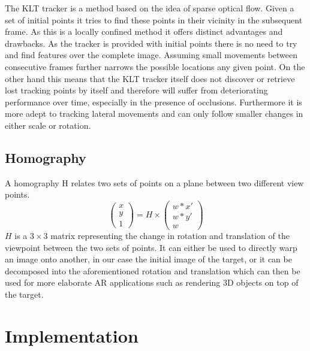 \documentclass[10pt,conference,compsocconf]{IEEEtran}
\begin{document}
The KLT tracker is a method based on the idea of sparse optical flow. Given a set of initial points it tries to find these points in their vicinity in the subsequent frame. As this is a locally confined method it offers distinct advantages and drawbacks. As the tracker is provided with initial points there is no need to try and find features over the complete image. Assuming small movements between consecutive frames further narrows the possible locations any given point. On the other hand this means that the KLT tracker itself does not discover or retrieve lost tracking points by itself and therefore will suffer from deteriorating performance over time, especially in the presence of occlusions. Furthermore it is more adept to tracking lateral movements and can only follow smaller changes in either scale or rotation. 

\subsection{Homography}

A homography H relates two sets of points on a plane between two different view points. 
\begin{equation}
\left( \begin{array}{c} x \\ y \\ 1 \end{array} \right) = H  \times \left( \begin{array}{c} w*x' \\ w*y' \\ w \end{array} \right)
\end{equation}
$H$ is a $3\times3$ matrix representing the change in rotation and translation of the viewpoint between the two sets of points. It can either be used to directly warp an image onto another, in our case the initial image of the target, or it can be decomposed into the aforementioned rotation and translation which can then be used for more elaborate AR applications such as rendering 3D objects on top of the target. 

\section{Implementation}
\end{document}
